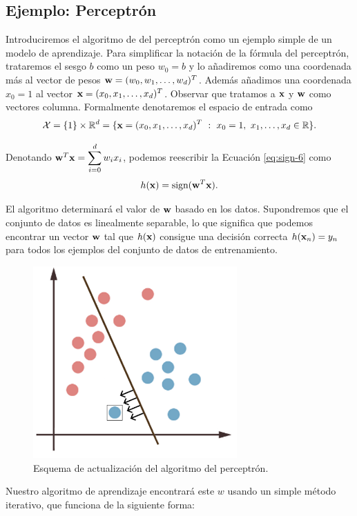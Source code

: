 \documentclass[oneside,openright,titlepage,numbers=noenddot,openany,headinclude,footinclude=true,
cleardoublepage=empty,abstractoff,BCOR=5mm,paper=a4,fontsize=12pt,main=spanish]{scrreprt}
\begin{document}
\subsection{Ejemplo: Perceptrón} \label{subsec:perceptron}

Introduciremos el algoritmo de del perceptrón como un ejemplo simple de un modelo de aprendizaje. Para simplificar la notación de la fórmula del perceptrón, trataremos el sesgo $b$ como un peso $w_0=b$ y lo añadiremos como una coordenada más al vector de pesos $\textbf{w}=(w_0,w_1,\dots,w_d)^T$. Además añadimos una coordenada $x_0=1$ al vector $\textbf{x}=(x_0,x_1,\dots,x_d)^T$. Observar que tratamos a $\textbf{x}$ y $\textbf{w}$ como vectores columna. Formalmente denotaremos el espacio de entrada como $$\mathcal{X}=\{1\}\times \mathbb{R}^d=\{\textbf{x}=(x_0,x_1,\dots,x_d)^T \ : \ x_0=1, \ x_1,\dots,x_d \in \mathbb{R}\}.$$

Denotando $\textbf{w}^T\textbf{x}=\displaystyle \sum_{i=0}^d w_ix_i$, podemos reescribir la Ecuación \ref{eq:sign-6} como $$h(\textbf{x})=\text{sign}(\textbf{w}^T\textbf{x}).$$

El algoritmo determinará el valor de $\textbf{w}$ basado en los datos. Supondremos que el conjunto de datos es linealmente separable, lo que significa que podemos encontrar un vector $\textbf{w}$ tal que $h(\textbf{x})$ consigue una decisión correcta $h(\textbf{x}_n)=y_n$ para todos los ejemplos del conjunto de datos de entrenamiento.\\

\begin{figure}[h]
	\centering
	\includegraphics[width=7.8cm]{movclassified.png}
	\caption{Esquema de actualización del algoritmo del perceptrón.}
    \label{fig:movsep}
\end{figure}

Nuestro algoritmo de aprendizaje encontrará este $w$ usando un simple método iterativo, que funciona de la siguiente forma:
\end{document}
